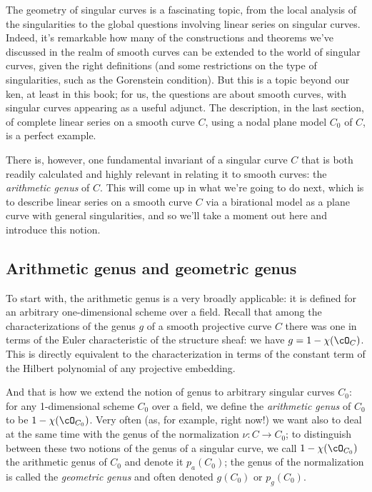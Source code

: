 The geometry of singular curves is a fascinating topic, from the local analysis of the singularities to the global questions involving linear series on singular curves. Indeed, it's remarkable how many of the constructions and theorems we've discussed in the realm of smooth curves can be extended to the world of singular curves, given the right definitions (and some restrictions on the type of singularities, such as the Gorenstein condition). But this is a topic beyond our ken, at least in this book; for us, the questions are about smooth curves, with singular curves appearing as a useful adjunct. The description, in the last section, of complete linear series on a smooth curve $C$, using a nodal plane model $C_0$ of $C$, is a perfect example.

There is, however, one fundamental invariant of a singular curve $C$ that is both readily calculated and highly relevant in relating it to smooth curves: the \emph{arithmetic genus} of $C$. This will come up in what we're going to do next, which is to describe linear series on a smooth curve $C$ via a birational model as a plane curve with general singularities, and so we'll take a moment out here and introduce this notion.

\subsection{Arithmetic genus and geometric genus}

To start with, the arithmetic genus is a very broadly applicable: it is defined for an arbitrary one-dimensional scheme over a field. Recall that among the characterizations of the genus $g$ of a smooth projective curve $C$ there was one in terms of the Euler characteristic of the structure sheaf: we have $g = 1 - \chi(\cO_C)$. This is directly equivalent to the characterization in terms of the constant term of the Hilbert polynomial of any projective embedding.

And that is how we extend the notion of genus to arbitrary singular curves $C_0$: for any 1-dimensional scheme $C_0$ over a field, we define the \emph{arithmetic genus} of $C_0$ to be $1-\chi(\cO_{C_0})$. Very often (as, for example, right now!) we want also to deal at the same time with the genus of the normalization $\nu : C \to C_0$; to distinguish between these two notions of the genus of a singular curve, we call $1-\chi(\cO_{C_0})$ the arithmetic genus of $C_0$ and denote it $p_a(C_0)$; the genus of the normalization is called the \emph{geometric genus} and often denoted $g(C_0)$ or $p_g(C_0)$.

